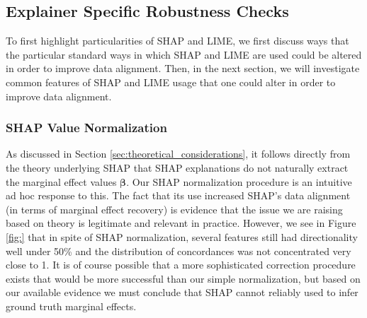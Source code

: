 \documentclass[mnsc,blindrev]{informs3}
\begin{document}
        
     


    
    
    \subsection{Explainer Specific Robustness Checks}
        To first highlight particularities of SHAP and LIME, we first discuss ways that the particular standard ways in which SHAP and LIME are used could be altered in order to improve data alignment. Then, in the next section, we will investigate common features of SHAP and LIME usage that one could alter in order to improve data alignment. 

            \subsubsection{SHAP Value Normalization}
                As discussed in Section \ref{sec:theoretical_considerations}, it follows directly from the theory underlying SHAP that SHAP explanations do not naturally extract the marginal effect values $\boldsymbol{\beta}$. Our SHAP normalization procedure is an intuitive ad hoc response to this. The fact that its use increased SHAP's data alignment (in terms of marginal effect recovery) is evidence that the issue we are raising based on theory is legitimate and relevant in practice. However, we see in Figure \ref{fig:} that in spite of SHAP normalization, several features still had directionality well under 50\% and the distribution of concordances was not concentrated very close to 1. It is of course possible that a more sophisticated correction procedure exists that would be more successful than our simple normalization, but based on our available evidence we must conclude that SHAP cannot reliably used to infer ground truth marginal effects.
                
                
\end{document}
